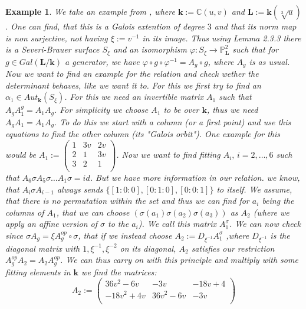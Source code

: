 \documentclass[12pt, oneside, reqno]{amsart}
\newtheorem{example}[theorem]{Example}
\begin{document}
\begin{example}
    We take an example from \cite{BSY}, where $\textbf{k} := \mathbb{C}(u,v)$ and $\textbf{L} := \textbf{k}(\sqrt[3]{u})$. One can find, that this is a Galois extention of degree $3$ and that its norm map is non surjective, not having $\xi := v^{-1}$ in its image. Thus using \cite{BSY} Lemma 2.3.3 there is a Severi-Brauer surface $S_{\xi}$ and an isomorphism $\varphi: S_{\xi} \rightarrow \mathbb{P}_{\textbf{L}}^2 $ such that for $g \in Gal(\textbf{L}/ \textbf{k})$ a generator, we have $\varphi \circ g \circ \varphi^{-1} = A_g \circ g$, where $A_g$ is as usual. Now we want to find an example for the relation and check wether the determinant behaves, like we want it to. For this we first try to find an $\alpha_1 \in Aut_{\textbf{k}}(S_{\xi})$. For this we need an invertible matrix $A_1$ such that $A_gA_1^g = A_1A_g$. For simplicity we choose $A_1$ to be over $\textbf{k}$, thus we need $A_gA_1 = A_1A_g$. To do this we start with a column (or a first point) and use this equations to find the other column (its "Galois orbit"). One example for this would be 
    $A_1 := \begin{pmatrix}
        1 & 3v & 2v \\
        2 & 1 & 3v \\
        3 & 2 & 1 \\
    \end{pmatrix}$.
    Now we want to find fitting $A_i, \, i=2, \dots , 6$ such that $A_6 \sigma A_5 \sigma \dots A_1 \sigma = id$. But we have more information in our relation. we know, that $A_i \sigma A_{i-1}$ always sends $\{ [1:0:0], [0:1:0], [0:0:1] \}$ to itself. We assume, that there is no permutation within the set and thus we can find for $a_{i}$ being the columns of $A_1$, that we can choose $(\sigma(a_{1})  \sigma(a_{2})  \sigma(a_{3})  )$ as $A_2$ (where we apply an affine version of $\sigma$ to the $a_i$). We call this matrix $A_1^{\sigma}$. We can now check since $\sigma A_g = \xi A_g^{op} \circ \sigma$, that if we instead choose $A_2 := D_{\xi^{-1}} A_1^{\sigma}$ ,where $D_{\xi^{-1}}$ is the diagonal matrix with $1,\xi^{-1},\xi^{-2}$ on its diagonal, $A_2$ satisfies our restriction $A_g^{op} A_2 = A_2 A_g^{op}$. We can thus carry on with this principle and multiply with some fitting elements in $\textbf{k}$ we find the matrices:
     \[A_2 := \begin{pmatrix}
        36v^2 - 6 v & -3v & -18v + 4 \\
        -18 v^2 + 4v & 36v^2 - 6 v & -3v \\

\end{pmatrix}\]
\end{example}
\end{document}
